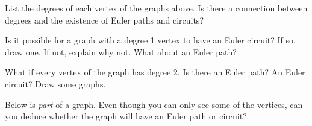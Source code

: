 \documentclass[12pt]{article}
\begin{document}
\begin{activity}
\begin{questions}
\question List the degrees of each vertex of the graphs above.  Is there a connection between degrees and the existence of Euler paths and circuits?

%
%


\question Is it possible for a graph with a degree 1 vertex to have an Euler circuit?  If so, draw one.  If not, explain why not.  What about an Euler path?


\question What if every vertex of the graph has degree 2.  Is there an Euler path?  An Euler circuit?  Draw some graphs.


\question Below is {\em part} of a graph.  Even though you can only see some of the vertices, can you deduce whether the graph will have an Euler path or circuit?

\begin{center}

\end{center}
\end{questions}
\end{activity}
\end{document}
